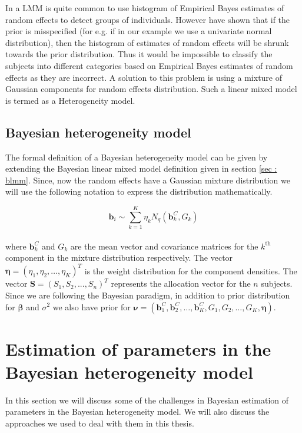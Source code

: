 In a LMM is quite common to use histogram of Empirical Bayes estimates of random effects to detect groups of individuals. However \citet{verbeke_linear_1996} have shown that if the prior is misspecified (for e.g. if in our example we use a univariate normal distribution), then the histogram of estimates of random effects will be shrunk towards the prior distribution. Thus it would be impossible to classify the subjects into different categories based on Empirical Bayes estimates of random effects as they are incorrect. A solution to this problem is using a mixture of Gaussian components for random effects distribution. Such a linear mixed model is termed as a Heterogeneity model.

\subsection{Bayesian heterogeneity model}
\label{subsec : bhtge}
The formal definition of a Bayesian heterogeneity model can be given by extending the Bayesian linear mixed model definition given in section \ref{sec : blmm}. Since, now the random effects have a Gaussian mixture distribution we will use the following notation to express the distribution mathematically.

$$\boldsymbol{b}_i \sim \sum_{k=1}^{K} \eta_k N_q(\boldsymbol{b}_k^C, G_k)$$\\
where $\boldsymbol{b}_k^C$ and $G_k$ are the mean vector and covariance matrices for the $k^\text{th}$ component in the mixture distribution respectively. The vector $\boldsymbol{\eta} = (\eta_1, \eta_2, \ldots, \eta_K)^T$ is the weight distribution for the component densities. The vector $\boldsymbol{S}=(S_1, S_2, ..., S_n)^T$ represents the allocation vector for the $n$ subjects. Since we are following the Bayesian paradigm, in addition to prior distribution for $\boldsymbol{\beta}$ and $\sigma^2$ we also have prior for $\boldsymbol{\nu} = (\boldsymbol{b}_1^C, \boldsymbol{b}_2^C, \ldots, \boldsymbol{b}_K^C, G_1, G_2, \ldots, G_K, \boldsymbol{\eta})$.

\section{Estimation of parameters in the Bayesian heterogeneity model}
In this section we will discuss some of the challenges in Bayesian estimation of parameters in the Bayesian heterogeneity model. We will also discuss the approaches we used to deal with them in this thesis.

